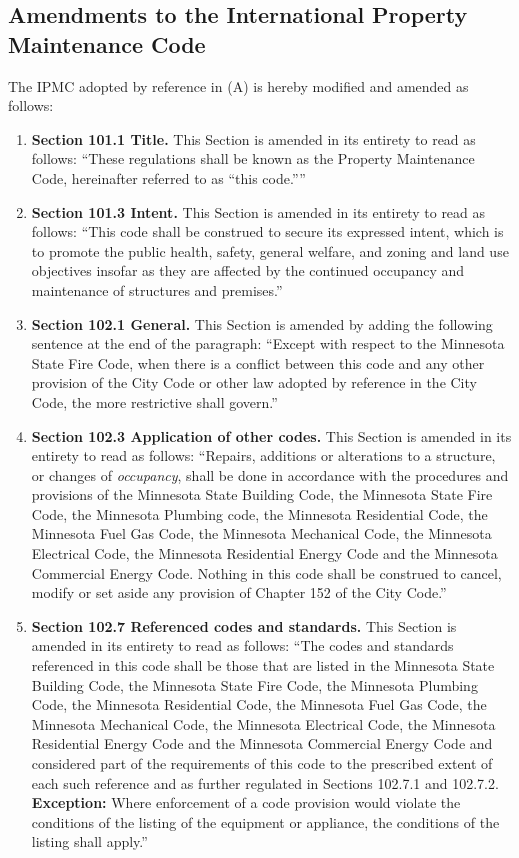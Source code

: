 \subsection{Amendments to the International Property Maintenance Code}
The IPMC adopted by reference in (A) is hereby modified and amended as follows:
\begin{enumerate}[{\indent}1)]
    \item \textbf{Section 101.1 Title.} This Section is amended in its entirety to read as follows: “These regulations shall be known as the Property Maintenance Code, hereinafter referred to as “this code.””
    \item \textbf{Section 101.3 Intent.} This Section is amended in its entirety to read as follows: “This code shall be construed to secure its expressed intent, which is to promote the public health, safety, general welfare, and zoning and land use objectives insofar as they are affected by the continued occupancy and maintenance of structures and premises.”
    \item \textbf{Section 102.1 General.} This Section is amended by adding the following sentence at the end of the paragraph: “Except with respect to the Minnesota State Fire Code, when there is a conflict between this code and any other provision of the City Code or other law adopted by reference in the City Code, the more restrictive shall govern.”
    \item \textbf{Section 102.3 Application of other codes.} This Section is amended in its entirety to read as follows: “Repairs, additions or alterations to a structure, or changes of \textit{occupancy}, shall be done in accordance with the procedures and provisions of the Minnesota State Building Code, the Minnesota State Fire Code, the Minnesota Plumbing code, the Minnesota Residential Code, the Minnesota Fuel Gas Code, the Minnesota Mechanical Code, the Minnesota Electrical Code, the Minnesota Residential Energy Code and the Minnesota Commercial Energy Code.  Nothing in this code shall be construed to cancel, modify or set aside any provision of Chapter 152 of the City Code.”
    \item \textbf{Section 102.7 Referenced codes and standards.} This Section is amended in its entirety to read as follows: “The codes and standards referenced in this code shall be those that are listed in the Minnesota State Building Code, the Minnesota State Fire Code, the Minnesota Plumbing Code, the Minnesota Residential Code, the Minnesota Fuel Gas Code, the Minnesota Mechanical Code, the Minnesota Electrical Code, the Minnesota Residential Energy Code and the Minnesota Commercial Energy Code and considered part of the requirements of this code to the prescribed extent of each such reference and as further regulated in Sections 102.7.1 and 102.7.2.  \textbf{Exception:} Where enforcement of a code provision would violate the conditions of the listing of the equipment or appliance, the conditions of the listing shall apply.”

\end{enumerate}
